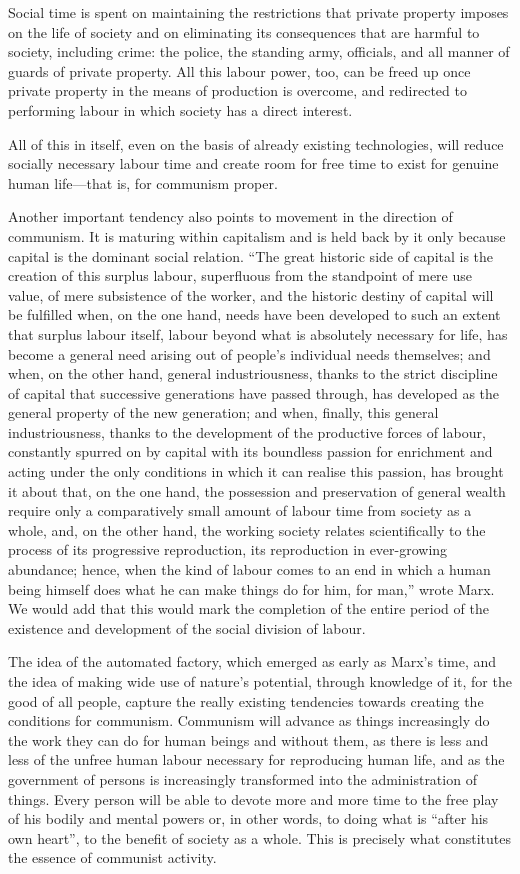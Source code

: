 \documentclass[../main]{subfiles}
\begin{document}
Social time is spent on maintaining the restrictions that private property imposes on the life of society and on eliminating its consequences that are harmful to society, including crime: the police, the standing army, officials, and all manner of guards of private property. All this labour power, too, can be freed up once private property in the means of production is overcome, and redirected to performing labour in which society has a direct interest.

All of this in itself, even on the basis of already existing technologies, will reduce socially necessary labour time and create room for free time to exist for genuine human life—that is, for communism proper.

Another important tendency also points to movement in the direction of communism. It is maturing within capitalism and is held back by it only because capital is the dominant social relation. “The great historic side of capital is the creation of this surplus labour, superfluous from the standpoint of mere use value, of mere subsistence of the worker, and the historic destiny of capital will be fulfilled when, on the one hand, needs have been developed to such an extent that surplus labour itself, labour beyond what is absolutely necessary for life, has become a general need arising out of people’s individual needs themselves; and when, on the other hand, general industriousness, thanks to the strict discipline of capital that successive generations have passed through, has developed as the general property of the new generation; and when, finally, this general industriousness, thanks to the development of the productive forces of labour, constantly spurred on by capital with its boundless passion for enrichment and acting under the only conditions in which it can realise this passion, has brought it about that, on the one hand, the possession and preservation of general wealth require only a comparatively small amount of labour time from society as a whole, and, on the other hand, the working society relates scientifically to the process of its progressive reproduction, its reproduction in ever-growing abundance; hence, when the kind of labour comes to an end in which a human being himself does what he can make things do for him, for man,” wrote Marx. We would add that this would mark the completion of the entire period of the existence and development of the social division of labour.

The idea of the automated factory, which emerged as early as Marx’s time, and the idea of making wide use of nature’s potential, through knowledge of it, for the good of all people, capture the really existing tendencies towards creating the conditions for communism. Communism will advance as things increasingly do the work they can do for human beings and without them, as there is less and less of the unfree human labour necessary for reproducing human life, and as the government of persons is increasingly transformed into the administration of things. Every person will be able to devote more and more time to the free play of his bodily and mental powers or, in other words, to doing what is “after his own heart”, to the benefit of society as a whole. This is precisely what constitutes the essence of communist activity.
\end{document}
